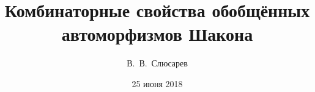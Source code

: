 
\title[Автоморфизмы Шакона]
{Комбинаторные свойства обобщённых автоморфизмов Шакона}


\author%
{В.~В.~Слюсарев}


\date[ 25.06.2018] %
{\normalsize 25 июня 2018 }


